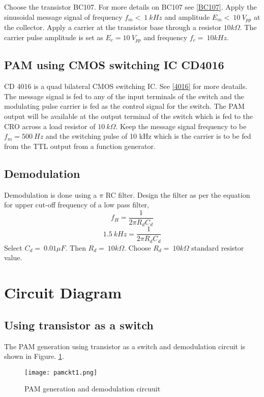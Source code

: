 \noindent Choose the transistor BC107. For more details on BC107 see \ref{BC107}.
\noindent Apply the sinusoidal message signal of frequency $f_m < \ 1 \ kHz$ and amplitude $E_m<\ 10\ V_{pp}$ at the collector.
\noindent Apply a carrier at the transistor base through a resistor $10 k\Omega$. The carrier pulse amplitude is set as $E_c =10 \ V_{pp}$ and frequency $f_c=\ 10 kHz$.

\subsection*{PAM using CMOS switching IC CD4016}
CD 4016 is a quad bilateral CMOS switching IC. See \ref{4016} for more deatails. The message signal is fed to any of the input terminals of the switch and the modulating pulse carrier is fed as the control signal for the switch. The PAM output will be available at the output terminal of the switch which is fed to the CRO across a load resistor of $10\ k\Omega$. Keep the message signal frequency to be $f_m=500 \ Hz$ and the switching pulse of 10 kHz which is the carrier is to be fed  from the TTL output from a function generator.

\subsection*{Demodulation}
Demodulation is done using a  $\pi$ RC filter.
\noindent Design the filter as per the equation for upper cut-off frequency of a low pass filter,
\begin{equation}
f_H=\frac{1}{2\pi R_dC_d}
\end{equation}
\begin{equation}
1.5\ kHz=\frac{1}{2\pi R_dC_d}
\end{equation}
\noindent Select $C_d=\ 0.01 \mu F$. Then $R_d=\ 10k\Omega$.
Choose $R_d=\ 10k\Omega$ standard resistor value.\\

\section*{Circuit Diagram}
\subsection*{Using transistor as a switch}

The PAM generation using transistor as a switch and demodulation circuit is shown in Figure. \ref{pamckt}.

\begin{figure}
\texttt{[image: pamckt1.png]}
\caption{PAM generation and demodulation circuuit}
\label{pamckt}
\end{figure}




